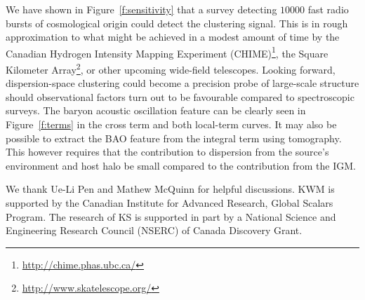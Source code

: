 \documentclass[twocolumn,prl,floatfix]{revtex4-1}
\begin{document}
We have
shown in Figure~\ref{f:sensitivity}
that a survey detecting $10000$ fast radio bursts of cosmological
origin could detect the
clustering signal. This is in rough
approximation to what might be achieved in a modest amount of time by the Canadian Hydrogen Intensity
Mapping Experiment (CHIME)\footnote{\url{http://chime.phas.ubc.ca/}}, the
Square Kilometer Array\footnote{\url{http://www.skatelescope.org/}},
or other upcoming wide-field telescopes.
Looking forward, dispersion-space
clustering could become a precision probe of large-scale structure should
observational factors turn out to be favourable compared to spectroscopic
surveys. The baryon acoustic oscillation feature can be clearly seen in
Figure~\ref{f:terms} in the cross term and both
local-term curves. It may also be possible to extract the BAO feature
from the integral
term using tomography.
This however requires that the contribution to dispersion from
the source's environment and host halo be small compared to the
contribution from the IGM.


\begin{acknowledgments}

We thank Ue-Li Pen and Mathew McQuinn for helpful discussions.
%
KWM is supported by the Canadian Institute for Advanced Research, Global Scalars
Program.  The research of KS is supported in part by a National Science and Engineering Research Council (NSERC) of Canada Discovery Grant.

\end{acknowledgments}




\end{document}
